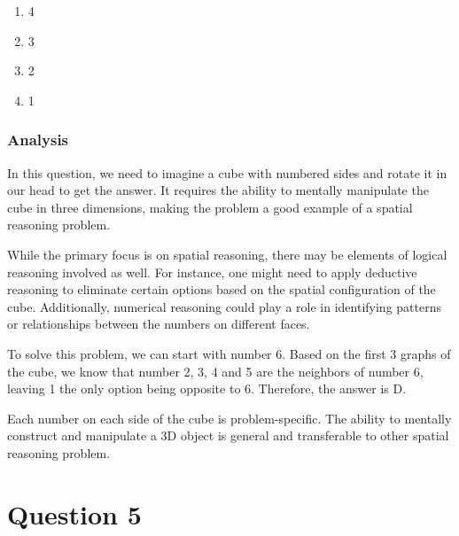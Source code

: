 \documentclass[12pt, a4paper]{article}
\begin{document}
\begin{enumerate}[label=(\Alph*)]
    \item 4
    \item 3
    \item 2
    \item 1
\end{enumerate}

\subsubsection*{Analysis}
In this question, we need to imagine a cube with numbered sides and rotate it in our head to get the answer. It requires the ability to mentally manipulate the cube in three dimensions, making the problem a good example of a spatial reasoning problem.

While the primary focus is on spatial reasoning, there may be elements of logical reasoning involved as well. For instance, one might need to apply deductive reasoning to eliminate certain options based on the spatial configuration of the cube. Additionally, numerical reasoning could play a role in identifying patterns or relationships between the numbers on different faces.

To solve this problem, we can start with number 6. Based on the first 3 graphs of the cube, we know that number 2, 3, 4 and 5 are the neighbors of number 6, leaving 1 the only option being opposite to 6. Therefore, the answer is D.

Each number on each side of the cube is problem-specific. The ability to mentally construct and manipulate a 3D object is general and transferable to other spatial reasoning problem.

\newpage
\section*{Question 5}
\end{document}
